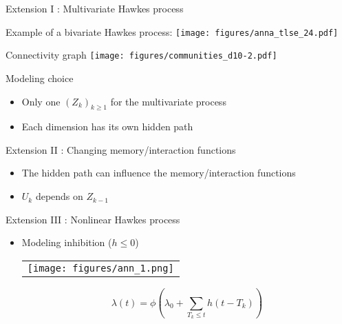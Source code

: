\documentclass[french,english]{beamer}
\begin{document}
\begin{frame}{Extension I : Multivariate Hawkes process}
\small
\begin{minipage}{6cm}
Example of a bivariate Hawkes process:
\centering
    \texttt{[image: figures/anna\_tlse\_24.pdf]}    
\end{minipage}
\begin{minipage}{3.5cm}
\centering
    Connectivity graph 
\texttt{[image: figures/communities\_d10-2.pdf]}
\end{minipage}

    \begin{block}{Modeling choice}
       \begin{itemize}
           \item Only one $(Z_k)_{k \geq 1}$ for the multivariate process
           \item Each dimension has its own hidden path
       \end{itemize} 
    \end{block}
\end{frame}
\begin{frame}{Extension II : Changing memory/interaction functions }
    
\begin{itemize}

    \item The hidden path can influence the memory/interaction functions
   \item  $ U_k$ depends on $Z_{k-1}$
\end{itemize}
  
\footnotesize
\begin{figure}
   \begin{centering}

\end{centering}
\end{figure}
\end{frame}


\begin{frame}{Extension III : Nonlinear Hawkes process}

\begin{itemize}
    \item Modeling inhibition ($h \leq 0$)

\begin{center}
    \begin{tabular}{c}
\texttt{[image: figures/ann\_1.png]}
    \end{tabular}
\end{center}

      $$ \lambda(t)= \phi \left( \lambda_0+  \underset{T_k \leq t}{\sum} h(t-T_k) \right)
$$


\end{itemize}
    

\end{frame}
\end{document}

